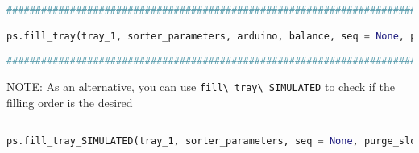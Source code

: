 \begin{lstlisting}[language=Python]
##################################################################################################################

ps.fill_tray(tray_1, sorter_parameters, arduino, balance, seq = None, purge_slot = 0, purge_time = 1)

###############################################################################################################
\end{lstlisting}

NOTE: As an alternative, you can use
\passthrough{\lstinline!fill\_tray\_SIMULATED!} to check if the filling
order is the desired

\begin{lstlisting}[language=Python]

ps.fill_tray_SIMULATED(tray_1, sorter_parameters, seq = None, purge_slot = 7, purge_time = 1)
\end{lstlisting}

\begin{lstlisting}[language=Python]
\end{lstlisting}
